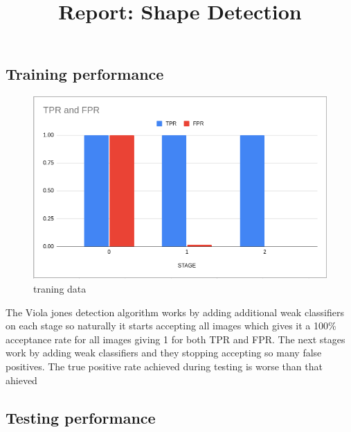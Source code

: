 \documentclass{article}
\begin{document}
\title{Report: Shape Detection}
\maketitle

\subsection{Training performance}

\begin{figure}[!htb]
    \includegraphics[width=\linewidth]{subtask1/trainingTPR_FPR.png}
    \caption{traning data}
    \label{fig:training}
\end{figure}

The Viola jones detection algorithm works by adding additional weak classifiers on each stage so naturally it starts accepting all images which gives it a 100\% acceptance rate for all images giving 1 for both TPR and FPR.
The next stages work by adding weak classifiers and they stopping accepting so many false positives.
The true positive rate achieved during testing is worse than that ahieved 

\subsection{Testing performance}
\end{document}
